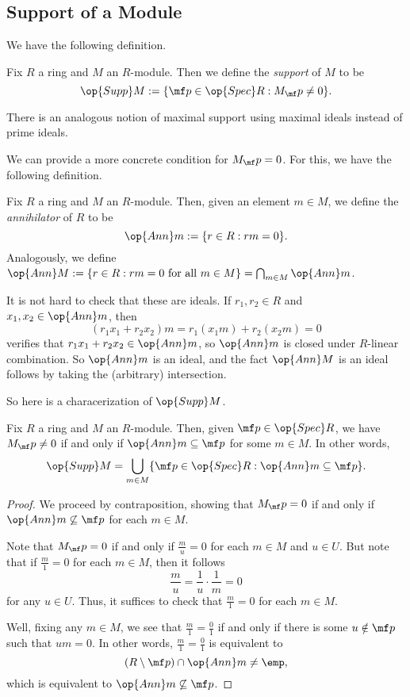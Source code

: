 \subsection{Support of a Module}
We have the following definition.
\begin{definition}[Support]
	Fix $R$ a ring and $M$ an $R$-module. Then we define the \textit{support} of $M$ to be
	\[\op{Supp}M:=\{\mf p\in\op{Spec}R:M_\mf p\ne0\}.\]
\end{definition}
There is an analogous notion of maximal support using maximal ideals instead of prime ideals.

We can provide a more concrete condition for $M_\mf p=0$. For this, we have the following definition.
\begin{definition}[Annihilator]
	Fix $R$ a ring and $M$ an $R$-module. Then, given an element $m\in M$, we define the \textit{annihilator} of $R$ to be
	\[\op{Ann}m:=\{r\in R:rm=0\}.\]
	Analogously, we define $\op{Ann}M:=\{r\in R:rm=0\text{ for all }m\in M\}=\bigcap_{m\in M}\op{Ann}m$.
\end{definition}
\begin{remark}
	It is not hard to check that these are ideals. If $r_1,r_2\in R$ and $x_1,x_2\in\op{Ann}m$, then
	\[(r_1x_1+r_2x_2)m=r_1(x_1m)+r_2(x_2m)=0\]
	verifies that $r_1x_1+r_2x_2\in\op{Ann}m$, so $\op{Ann}m$ is closed under $R$-linear combination. So $\op{Ann}m$ is an ideal, and the fact $\op{Ann}M$ is an ideal follows by taking the (arbitrary) intersection.
\end{remark}
So here is a characerization of $\op{Supp}M$.
\begin{proposition} \label{prop:generalsupport}
	Fix $R$ a ring and $M$ an $R$-module. Then, given $\mf p\in\op{Spec}R$, we have $M_\mf p\ne0$ if and only if $\op{Ann}m\subseteq\mf p$ for some $m\in M$. In other words,
	\[\op{Supp}M=\bigcup_{m\in M}\{\mf p\in\op{Spec}R:\op{Ann}m\subseteq\mf p\}.\]
\end{proposition}
\begin{proof}
	We proceed by contraposition, showing that $M_\mf p=0$ if and only if $\op{Ann}m\not\subseteq\mf p$ for each $m\in M$.
	
	Note that $M_\mf p=0$ if and only if $\frac mu=0$ for each $m\in M$ and $u\in U$. But note that if $\frac m1=0$ for each $m\in M$, then it follows
	\[\frac mu=\frac1u\cdot\frac1m=0\]
	for any $u\in U$. Thus, it suffices to check that $\frac m1=0$ for each $m\in M$.

	Well, fixing any $m\in M$, we see that $\frac m1=\frac01$ if and only if there is some $u\notin\mf p$ such that $um=0$. In other words, $\frac m1=\frac01$ is equivalent to
	\[(R\setminus\mf p)\cap\op{Ann}m\ne\emp,\]
	which is equivalent to $\op{Ann}m\not\subseteq\mf p$.
\end{proof}
